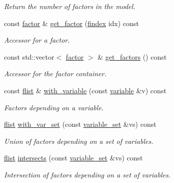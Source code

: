 \begin{DoxyCompactItemize}
\begin{DoxyCompactList}\small\item\em Return the number of factors in the model. \end{DoxyCompactList}\item 
const \hyperlink{classmerlin_1_1factor}{factor} \& \hyperlink{classmerlin_1_1graphical__model_ab2c87e3a4cfa3e511e089f3f6b1bd981}{get\+\_\+factor} (\hyperlink{classmerlin_1_1graphical__model_ab2b46f09d8142bb68f243ecadbdabb6b}{findex} idx) const 
\begin{DoxyCompactList}\small\item\em Accessor for a factor. \end{DoxyCompactList}\item 
const std\+::vector$<$ \hyperlink{classmerlin_1_1factor}{factor} $>$ \& \hyperlink{classmerlin_1_1graphical__model_a0d80510846922ce3cabf088aa04af040}{get\+\_\+factors} () const 
\begin{DoxyCompactList}\small\item\em Accessor for the factor container. \end{DoxyCompactList}\item 
const \hyperlink{classmerlin_1_1graphical__model_a615e25ec6594615fddfd4c3c4776b99f}{flist} \& \hyperlink{classmerlin_1_1graphical__model_a2e00ea842135f7a2169278ce19cda9d9}{with\+\_\+variable} (const \hyperlink{classmerlin_1_1variable}{variable} \&v) const 
\begin{DoxyCompactList}\small\item\em Factors depending on a variable. \end{DoxyCompactList}\item 
\hyperlink{classmerlin_1_1graphical__model_a615e25ec6594615fddfd4c3c4776b99f}{flist} \hyperlink{classmerlin_1_1graphical__model_ab84efb8f3a131e6f0a5bb179804b3e9d}{with\+\_\+var\+\_\+set} (const \hyperlink{classmerlin_1_1variable__set}{variable\+\_\+set} \&vs) const 
\begin{DoxyCompactList}\small\item\em Union of factors depending on a set of variables. \end{DoxyCompactList}\item 
\hyperlink{classmerlin_1_1graphical__model_a615e25ec6594615fddfd4c3c4776b99f}{flist} \hyperlink{classmerlin_1_1graphical__model_ac2841d98a5d54bc5bf384facb939e57a}{intersects} (const \hyperlink{classmerlin_1_1variable__set}{variable\+\_\+set} \&vs) const 
\begin{DoxyCompactList}\small\item\em Intersection of factors depending on a set of variables. \end{DoxyCompactList}\item 

\end{DoxyCompactItemize}
